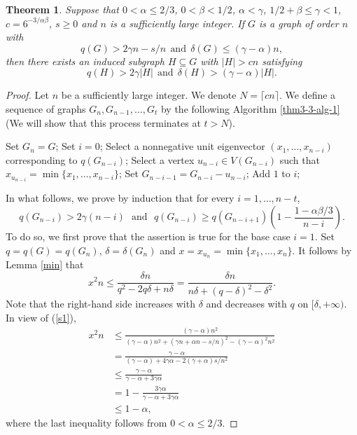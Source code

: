 \documentclass[11pt,a4paper]{article}
\theoremstyle{plain}
\newtheorem{theorem}{Theorem}[section]
\theoremstyle{definition}
\begin{document}
\begin{theorem}\label{h1}
Suppose that $0<\alpha\leq2/3$, $0<\beta<1/2$, $\alpha < \gamma$,  $1/2+\beta\leq\gamma<1$, $c=6^{-3/\alpha\beta}$, $s\geq 0$ and $n$ is a sufficiently large integer. If $G$ is a graph of order $n$ with
\begin{equation}\label{s1}
q(G)>2\gamma n-s/n~~\mbox{and}~~\delta(G)\leq(\gamma-\alpha)n,
\end{equation}
then there exists an induced subgraph $H\subseteq G$ with $|H|>c n$ satisfying 
$$q(H)>2\gamma |H|~~\mbox{and}~~\delta(H)>(\gamma-\alpha)|H|.$$
\end{theorem}
\begin{proof}
 Let $n$ be a sufficiently large integer. 
 We denote $N=\lceil c n\rceil$.
We define a sequence of graphs $G_{n}, G_{n-1},\ldots, G_{t}$ by the following Algorithm \ref{thm3-3-alg-1} (We will show that this process terminates at $t> N$). 

\begin{algorithm}[H] 
\caption{Graph Reduction Algorithm Based on the Perron Eigenvector}
\label{thm3-3-alg-1}
\begin{algorithmic}[1]
\STATE Set \( G_n = G \); 
\STATE Set \( i = 0 \);
    \STATE Select a nonnegative unit eigenvector \((x_1, \ldots, x_{n-i})\) corresponding to \( q(G_{n-i}) \);
    \STATE Select a vertex \( u_{n-i} \in V(G_{n-i}) \) such that \( x_{u_{n-i}} = \min\{x_1, \ldots, x_{n-i}\} \);
    \STATE Set \( G_{n-i-1} = G_{n-i} - u_{n-i} \);
    \STATE Add $1$ to $i$;  
\ENDWHILE
\end{algorithmic}
\end{algorithm}  
 In what follows, we prove by induction that 
 for every $i=1,\ldots,n-t$, 
\begin{equation}\label{s2}
q(G_{n-i})>2\gamma (n-i)~~~\mbox{and}~~~
q(G_{n-i})\geq q(G_{n-i+1})
\left(1- \frac{1- \alpha\beta/3}{n-i} \right).
\end{equation}
To do so, we first prove that the assertion is true for the base case $i=1$. Set $q=q(G)=q(G_{n})$, $\delta=\delta(G_n)$ and $x=x_{u_{n}}=\min\{x_1,\ldots, x_n\}$. 
It follows by Lemma \ref{min} that 
$$x^{2} n\leq \frac{\delta n}{q^{2}-2q\delta+n\delta}=\frac{\delta n}{n\delta+(q-\delta)^{2}-\delta^{2}}.$$
Note that the right-hand side increases with $\delta$ and decreases with $q$ on $[\delta,+\infty)$.
In view of (\ref{s1}), 
\begin{displaymath}
\begin{split}
x^{2}n &\leq \frac{(\gamma-\alpha)n^2}{(\gamma-\alpha)n^2
+(\gamma n+\alpha n -s/n)^{2}-(\gamma-\alpha)^{2}n^2}\\
&= \frac{\gamma-\alpha}{(\gamma-\alpha) 
+4\gamma \alpha-2(\gamma+\alpha)s/n^{2}}\\
&\leq \frac{\gamma -\alpha}{\gamma-\alpha
+3\gamma \alpha} \\
&= 1- \frac{3\gamma \alpha}{\gamma-\alpha
+3\gamma \alpha}\\
&\leq  1-\alpha,
\end{split}
\end{displaymath}
where the last inequality follows from $0<\alpha\leq2/3$.


\end{proof}
\end{document}
